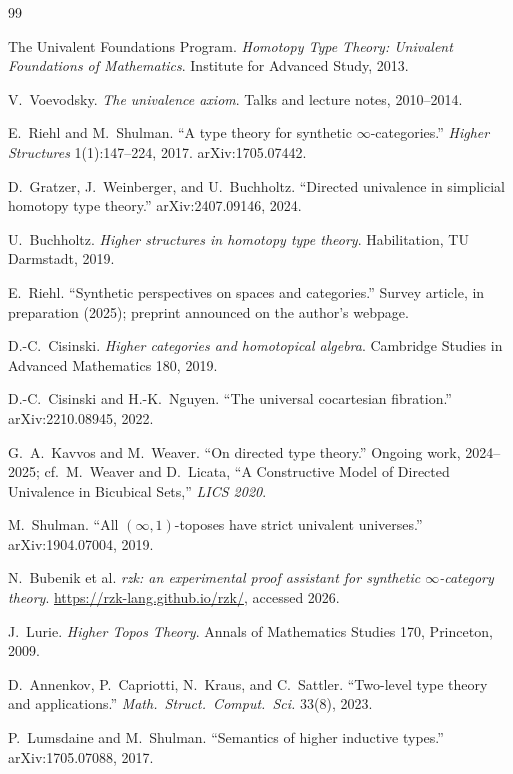 \documentclass[12pt]{article}
\theoremstyle{definition}
\theoremstyle{remark}
\begin{document}
\begin{thebibliography}{99}

 The Univalent Foundations Program. \emph{Homotopy Type Theory: Univalent Foundations of Mathematics}. Institute for Advanced Study, 2013.

 V.\ Voevodsky. \emph{The univalence axiom}. Talks and lecture notes, 2010--2014.

 E.\ Riehl and M.\ Shulman. ``A type theory for synthetic $\infty$-categories.'' \emph{Higher Structures} 1(1):147--224, 2017. arXiv:1705.07442.

 D.\ Gratzer, J.\ Weinberger, and U.\ Buchholtz. ``Directed univalence in simplicial homotopy type theory.'' arXiv:2407.09146, 2024.

 U.\ Buchholtz. \emph{Higher structures in homotopy type theory}. Habilitation, TU Darmstadt, 2019.

 E.\ Riehl. ``Synthetic perspectives on spaces and categories.'' Survey article, in preparation (2025); preprint announced on the author's webpage.

 D.-C.\ Cisinski. \emph{Higher categories and homotopical algebra}. Cambridge Studies in Advanced Mathematics 180, 2019.

 D.-C.\ Cisinski and H.-K.\ Nguyen. ``The universal cocartesian fibration.'' arXiv:2210.08945, 2022.

 G.\ A.\ Kavvos and M.\ Weaver. ``On directed type theory.'' Ongoing work, 2024--2025; cf.\ M.\ Weaver and D.\ Licata, ``A Constructive Model of Directed Univalence in Bicubical Sets,'' \emph{LICS 2020}.

 M.\ Shulman. ``All $(\infty,1)$-toposes have strict univalent universes.'' arXiv:1904.07004, 2019.

 N.\ Bubenik et al. \emph{rzk: an experimental proof assistant for synthetic $\infty$-category theory}. \url{https://rzk-lang.github.io/rzk/}, accessed 2026.

 J.\ Lurie. \emph{Higher Topos Theory}. Annals of Mathematics Studies 170, Princeton, 2009.

 D.\ Annenkov, P.\ Capriotti, N.\ Kraus, and C.\ Sattler. ``Two-level type theory and applications.'' \emph{Math.\ Struct.\ Comput.\ Sci.} 33(8), 2023.

 P.\ Lumsdaine and M.\ Shulman. ``Semantics of higher inductive types.'' arXiv:1705.07088, 2017.


\end{thebibliography}
\end{document}
